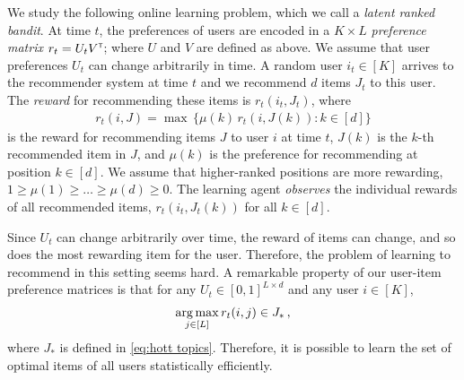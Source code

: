 
We study the following online learning problem, which we call a \emph{latent ranked bandit}. At time $t$, the preferences of users are encoded in a $K \times L$ \emph{preference matrix} $r_t = U_t V^\mathsf{\scriptscriptstyle T}$; where $U$ and $V$ are defined as above. We assume that user preferences $U_t$ can change arbitrarily in time. A random user $i_t \in [K]$ arrives to the recommender system at time $t$ and we recommend $d$ items $J_t$ to this user. The \emph{reward} for recommending these items is $r_t(i_t, J_t)$, where
\begin{align}
  r_t(i, J) =
  \max \, \{\mu(k) \, r_t(i, J(k)): k \in [d]\}
  \label{eq:reward}
\end{align}
is the reward for recommending items $J$ to user $i$ at time $t$, $J(k)$ is the $k$-th recommended item in $J$, and $\mu(k)$ is the preference for recommending at position $k \in [d]$. We assume that higher-ranked positions are more rewarding, $1 \geq \mu(1) \geq \dots \geq \mu(d) \geq 0$. The learning agent \emph{observes} the individual rewards of all recommended items, $r_t(i_t, J_t(k))$ for all $k \in [d]$.  

Since $U_t$ can change arbitrarily over time, the reward of items can change, and so does the most rewarding item for the user. Therefore, the problem of learning to recommend in this setting seems hard. A remarkable property of our user-item preference matrices is that for any $U_t \in [0, 1]^{L \times d}$ and any user $i \in [K]$,
\begin{align*}
  \mathop{\rm arg\,max}_{j \in [L]} r_t(i, j) \in J_\ast\,,
\end{align*}
where $J_\ast$ is defined in \eqref{eq:hott topics}. Therefore, it is possible to learn the set of optimal items of all users statistically efficiently.

